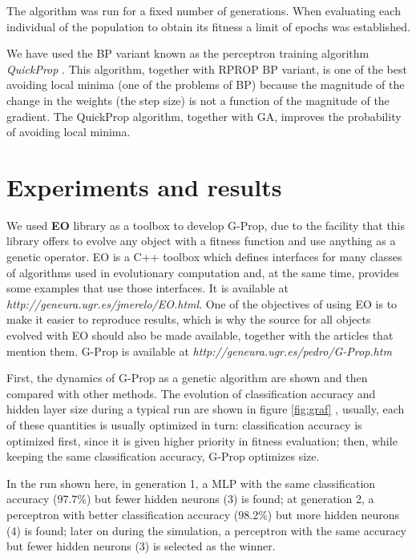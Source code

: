 \documentclass{elsart}
\begin{document}
The algorithm was run for a fixed number of generations.
When evaluating each individual of the population to obtain its fitness a limit of epochs was established. 


We have used the BP variant known as the perceptron training algorithm \emph{QuickProp} \cite{FahlmanQP}. This algorithm, together with RPROP \cite{Riedmiller93,Riedmiller94} BP variant, is one of the best avoiding local minima (one of the problems of BP) because the magnitude of the change in the weights (the step size) is not a function of the magnitude of the gradient.
The QuickProp algorithm, together with GA, improves the probability of avoiding local minima.
 

\section{Experiments and results}
\label{sec:expe}

We used \textbf{EO} library as a toolbox to develop G-Prop, due to the facility that this library offers to evolve any object with a fitness function and use anything as a genetic operator. EO is a C++ toolbox which defines interfaces for many classes of algorithms used in evolutionary computation and, at the same time, provides some examples that use those interfaces. It is available at \emph{http://geneura.ugr.es/jmerelo/EO.html}. One of the objectives of using EO is to make it easier to reproduce results, which is why the source for all objects evolved with EO should also be made available, together with the articles that mention them. G-Prop is available at \emph{http://geneura.ugr.es/pedro/G-Prop.htm}

First, the dynamics of G-Prop as a genetic algorithm are shown and then compared with other methods.
The evolution of classification accuracy and hidden layer size during a typical run are shown in figure  \ref{fig:graf} , usually, each of these quantities is usually optimized in turn: classification accuracy is optimized first, since it is given higher priority in fitness evaluation; then, while keeping the same classification accuracy, G-Prop optimizes size. 

In the run shown here, in generation 1, a MLP with the same classification accuracy ($97.7\%$) but fewer hidden neurons (3) is found; at generation 2, a perceptron with better classification accuracy ($98.2\%$) but more hidden neurons (4) is found; later on during the simulation, a perceptron with the same accuracy but fewer hidden neurons (3) is selected as the winner.
\end{document}
